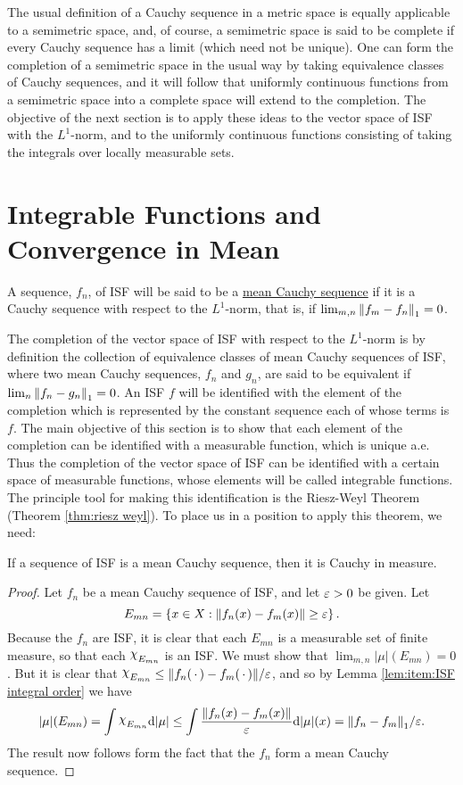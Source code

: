 The usual definition of a Cauchy sequence in a metric space is equally applicable to a semimetric space, and, of course, a semimetric space is said to be complete if every Cauchy sequence has a limit (which need not be unique). One can form the completion of a semimetric space in the usual way by taking equivalence classes of Cauchy sequences, and it will follow that uniformly continuous functions from a semimetric space into a complete space will extend to the completion. The objective of the next section is to apply these ideas to the vector space of ISF with the $L^1$-norm, and to the uniformly continuous functions consisting of taking the integrals over locally measurable sets.

\section{Integrable Functions and Convergence in Mean}

\begin{definition}
A sequence, $f_n$, of ISF will be said to be a \underline{mean Cauchy sequence} if it is a Cauchy sequence with respect to the $L^1$-norm, that is, if $\lim_{m, n}\norm{f_m-f_n}_1=0$.
\end{definition}

The completion of the vector space of ISF with respect to the $L^1$-norm is by definition the collection of equivalence classes of mean Cauchy sequences of ISF, where two mean Cauchy sequences, $f_n$ and $g_n$, are said to be equivalent if $\lim_n\norm{f_n-g_n}_1=0$. An ISF $f$ will be identified with the element of the completion which is represented by the constant sequence each of whose terms is $f$. The main objective of this section is to show that each element of the completion can be identified with a measurable function, which is unique a.e. Thus the completion of the vector space of ISF can be identified with a certain space of measurable functions, whose elements will be called integrable functions. The principle tool for making this identification is the Riesz-Weyl Theorem (Theorem \ref{thm:riesz weyl}). To place us in a position to apply this theorem, we need:

\begin{lemma}
\label{lem:ISF mean cauchy implies cauchy in measure}
If a sequence of ISF is a mean Cauchy sequence, then it is Cauchy in measure.
\end{lemma}

\begin{proof}
Let $f_n$ be a mean Cauchy sequence of ISF, and let $\varepsilon>0$ be given. Let $$E_{mn}=\left\{x\in X:\norm{f_n(x)-f_m(x)}\geq\varepsilon\right\}.$$ Because the $f_n$ are ISF, it is clear that each $E_{mn}$ is a measurable set of finite measure, so that each $\idf{E_{mn}}$ is an ISF. We must show that $\lim_{m,n}|\mu|(E_{mn})=0$. But it is clear that $\idf{E_{mn}}\leq\norm{f_n(\imarg)-f_m(\imarg)}/\ep$, and so by Lemma \ref{lem:item:ISF integral order} we have $$|\mu|(E_{mn})=\int\idf{E_{mn}}\dd|\mu|\leq\int\frac{\norm{f_n(x)-f_m(x)}}{\ep}\dd|\mu|(x)=\norm{f_n-f_m}_1/\ep.$$ The result now follows form the fact that the $f_n$ form a mean Cauchy sequence.
\end{proof}

